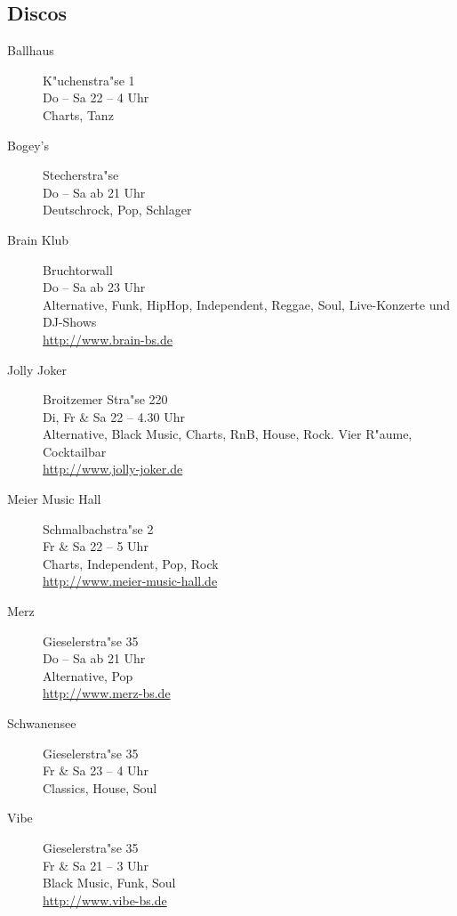 \begin{multicols}{2}
\subsection{Discos}
	\begin{description}
		\item[Ballhaus] \hfill K"uchenstra"se 1\\
		Do -- Sa \hfill 22 -- 4 Uhr\\
		Charts, Tanz

		\item[Bogey's] \hfill Stecherstra"se\\
		Do -- Sa \hfill ab 21 Uhr\\
		Deutschrock, Pop, Schlager

		\item[Brain Klub] \hfill Bruchtorwall\\
		Do -- Sa \hfill ab 23 Uhr\\
		Alternative, Funk, HipHop, Independent, Reggae, Soul, Live-Konzerte und DJ-Shows\\
		\url{http://www.brain-bs.de}

		\item[Jolly Joker] \hfill Broitzemer Stra"se 220\\
		Di, Fr \& Sa \hfill 22 -- 4.30 Uhr\\
		Alternative, Black Music, Charts, RnB, House, Rock. Vier R"aume, Cocktailbar\\
		\url{http://www.jolly-joker.de}

		\item[Meier Music Hall] \hfill Schmalbachstra"se 2\\
		Fr \& Sa \hfill 22 -- 5 Uhr\\
		Charts, Independent, Pop, Rock\\
		\url{http://www.meier-music-hall.de}

		\item[Merz] \hfill Gieselerstra"se 35\\
		Do -- Sa \hfill ab 21 Uhr\\
		Alternative, Pop\\
		\url{http://www.merz-bs.de}

		\item[Schwanensee] \hfill Gieselerstra"se 35\\
		Fr \& Sa \hfill 23 -- 4 Uhr\\
		Classics, House, Soul

		\item[Vibe] \hfill Gieselerstra"se 35\\
		Fr \& Sa \hfill 21 -- 3 Uhr\\
		Black Music, Funk, Soul\\
		\url{http://www.vibe-bs.de}
	\end{description}


\end{multicols}
